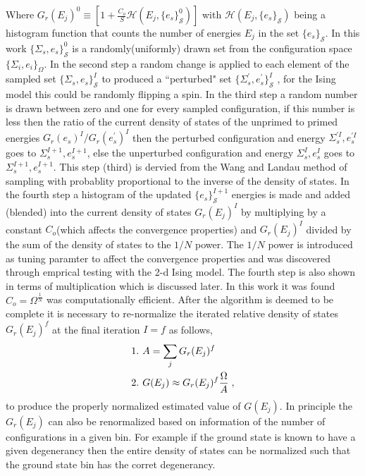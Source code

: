 \documentclass[aps,prl,reprint,superscriptaddress,showkeys]{revtex4-1}
\begin{document}
Where  $G_{r}(E_j)^0 \equiv [1 +  \frac{C_o}{S}\mathcal{H}(E_j,\{e_s\}_{\mathcal{S}}^0)]$ with $\mathcal{H}(E_j,\{e_s\}_{\mathcal{S}})$ being a histogram function that counts the number of energies $E_j$ in the set $\{e_s\}_{\mathcal{S}}$. In this work $\{\Sigma_{s},e_s\}_{\mathcal{S}}^0$  is a randomly(uniformly) drawn set from the configuration space $\{ \Sigma_i, e_i \}_\Omega $. In the second step  a random change is applied to each element of the sampled set $\{\Sigma_{s},e_s\}_{\mathcal{S}}^I$ to produced a ``perturbed" set $ \{\Sigma_{s}^{'},e_s^{'}\}_{\mathcal{S}}^I$ , for the Ising model this could be randomly flipping a spin.  In the third step a random number is drawn between zero and one for every sampled configuration, if this number is less then the ratio of the current density of states of the unprimed to primed energies $G_{r}(e_s)^{I}/G_{r}(e_s^{'})^{I}$ then the perturbed configuration and energy  $\Sigma_{s}^{'I},e_s^{'I}$  goes to $\Sigma_{s}^{I+1},e_s^{I+1}$,  else the unperturbed configuration and energy $\Sigma_{s}^{I},e_s^I$  goes to $\Sigma_{s}^{I+1},e_s^{I+1}$. This step (third) is dervied from the Wang and Landau method of sampling with probablity proportional to the inverse of the density of states.  In the fourth step a histogram of the updated $\{ e_s \}^{I+1}_{\mathcal{S}}$ energies is made and added (blended) into the current density of states $G_{r}(E_j)^I$   by multiplying  by a constant $C_{o}$(which affects the convergence properties) and   $G_{r}(E_j)^{I}$ divided by the sum of the density of states to the $1/N$ power. The $1/N$ power is introduced as tuning paramter to affect the convergence properties and was discovered through emprical testing with the 2-d Ising model.  The fourth step is also shown in terms of multiplication which is discussed later. In this work it was found  $C_{o}=\Omega^{\frac{1}{N}}$ was computationally efficient. After the algorithm is deemed to be complete it is necessary to re-normalize the iterated relative density of states $G_{r}(E_j)^f$ at the final iteration $I=f$ as follows, 
\begin{equation}
\begin{split}
&1. \hspace{0.125cm} A = \sum_jG_{r}(E_j)^f\\
&2. \hspace{0.125cm} G(E_j)\approx G_{r}(E_j)^f \frac{\Omega}{A} \;,
\end{split}
\label{renormalize}
\end{equation}
to produce the properly normalized estimated value of $G(E_j)$. In principle the $G_{r}(E_j)$ can also be renormalized based on information of the number of configurations in a given bin. For example if the ground state is known to have a given degenerancy then the entire density of states can be normalized such that the ground state bin has the corret degenerancy. 
\end{document}
